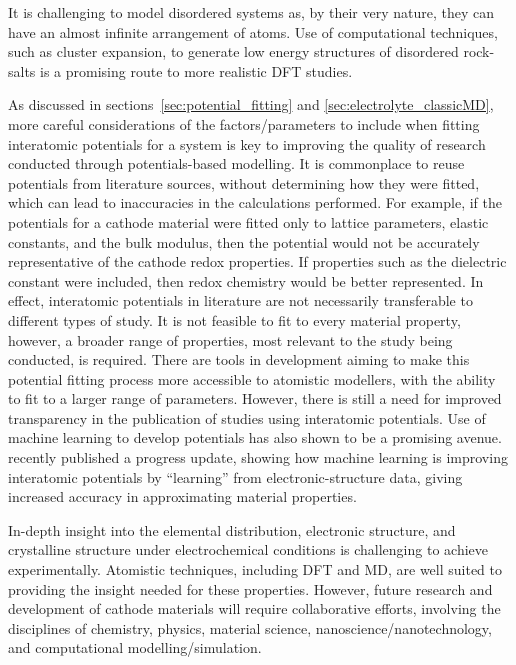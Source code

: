 \documentclass[../main.tex]{subfiles}
\begin{document}
It is challenging to model disordered systems as, by their very nature, they can have an almost infinite arrangement of atoms. Use of computational techniques, such as cluster expansion, to generate low energy structures of disordered rock-salts is a promising route to more realistic DFT studies.\cite{Lun2020}

As discussed in sections~\ref{sec:potential_fitting} and \ref{sec:electrolyte_classicMD}, more careful considerations of the factors/parameters to include when fitting interatomic potentials for a system is key to improving the quality of research conducted through potentials-based modelling. It is commonplace to reuse potentials from literature sources, without determining how they were fitted, which can lead to inaccuracies in the calculations performed. For example, if the potentials for a cathode material were fitted only to lattice parameters, elastic constants, and the bulk modulus, then the potential would not be accurately representative of the cathode redox properties. If properties such as the dielectric constant were included, then redox chemistry would be better represented. In effect, interatomic potentials in literature are not necessarily transferable to different types of study. It is not feasible to fit to every material property, however, a broader range of properties, most relevant to the study being conducted, is required. There are tools in development \cite{gale_empirical_1996, Stukowski_2017, wen_kim-compliant_2017, Morgan2021PopOff} aiming to make this potential fitting process more accessible to atomistic modellers, with the ability to fit to a larger range of parameters. However, there is still a need for improved transparency in the publication of studies using interatomic potentials. Use of machine learning to develop potentials has also shown to be a promising avenue. \citeauthor{deringer2019machine} recently published a progress update, showing how machine learning is improving interatomic potentials by ``learning'' from electronic-structure data, giving increased accuracy in approximating material properties.\cite{deringer2019machine}

In-depth insight into the elemental distribution, electronic structure, and crystalline structure under electrochemical conditions is challenging to achieve experimentally. Atomistic techniques, including DFT and MD, are well suited to providing the insight needed for these properties. However, future research and development of cathode materials will require collaborative efforts, involving the disciplines of chemistry, physics, material science, nanoscience/nanotechnology, and computational modelling/simulation.\cite{yu2018electrode}
\end{document}
